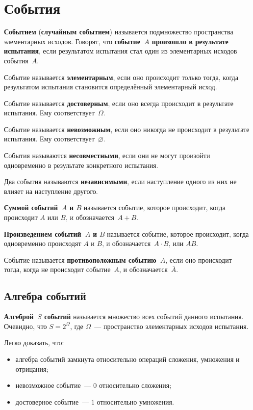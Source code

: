 \section{События}
 \textbf{Событием} (\textbf{случайным событием}) называется подмножество пространства элементарных исходов.
Говорят, что \textbf{событие~$A$ произошло в результате испытания}, если результатом испытания стал один из элементарных исходов события~$A$.

Событие называется \textbf{элементарным}, если оно происходит только тогда, когда результатом испытания становится определённый элементарный исход.

Событие называется \textbf{достоверным}, если оно всегда происходит в результате испытания.
Ему соответствует~$\Omega$.

Событие называется \textbf{невозможным}, если оно никогда не происходит в результате испытания.
Ему соответствует~$\varnothing$.

События называются \textbf{несовместными}, если они не могут произойти одновременно в результате конкретного испытания.

Два события называются \textbf{независимыми}, если наступление одного из них не влияет на наступление другого.

\textbf{Суммой событий~$A$ и $B$} называется событие, которое происходит, когда происходит $A$ или $B$, и обозначается~$A + B$.

\textbf{Произведением событий~$A$ и $B$} называется событие, которое происходит, когда одновременно происходят $A$ и $B$, и обозначается~$A \cdot B$, или $AB$.

Событие называется \textbf{противоположным событию~$A$}, если оно происходит тогда, когда не происходит событие~$A$, и обозначается~$\overline A$.

\subsection{Алгебра событий}
 \textbf{Алгеброй~$S$ событий} называется множество всех событий данного испытания.
Очевидно, что $S = 2^\Omega$, где $\Omega$~--- пространство элементарных исходов испытания.

Легко доказать, что:
\begin{itemize}
	\item алгебра событий замкнута относительно операций сложения, умножения и отрицания;
	\item невозможное событие~--- $0$ относительно сложения;
	\item достоверное событие~--- $1$ относительно умножения.
\end{itemize}